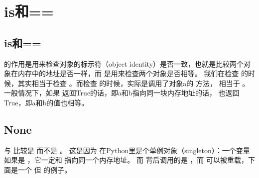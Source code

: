 \documentclass[letterpaper,10pt,english]{sphinxmanual}
\begin{document}
\section{is和==}
\label{\detokenize{python/03_is:is}}\label{\detokenize{python/03_is::doc}}

\subsection{is和==}
\label{\detokenize{python/03_is:id1}}
 的作用是用来检查对象的标示符（object identity）是否一致，也就是比较两个对象在内存中的地址是否一样，而 \sphinxcode{\sphinxupquote{==}} 是用来检查两个对象是否相等。
我们在检查  的时候，其实相当于检查 。而检查  的时候，实际是调用了对象a的  方法，
相当于 。
一般情况下，如果  返回True的话，即a和b指向同一块内存地址的话， 也返回True，即a和b的值也相等。

%
\begin{sphinxVerbatim}[commandchars=\\\{\},numbers=left,firstnumber=1,stepnumber=1]
  
  
  
    
 
 

  \PYG{p}{[}\PYG{p}{]}
  
  
    
\end{sphinxVerbatim}


\subsection{None}
\label{\detokenize{python/03_is:none}}
与  比较是  而不是  。
这是因为  在Python里是个单例对象（singleton）：一个变量如果是  ，它一定和  指向同一个内存地址。
而  背后调用的是  ，而  可以被重载，下面是一个  但  的例子。
\end{document}
